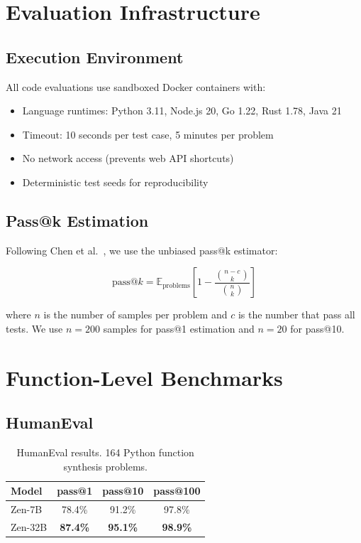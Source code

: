 \documentclass[11pt,a4paper]{article}
\begin{document}
\section{Evaluation Infrastructure}

\subsection{Execution Environment}

All code evaluations use sandboxed Docker containers with:
\begin{itemize}
  \item Language runtimes: Python 3.11, Node.js 20, Go 1.22, Rust 1.78, Java 21
  \item Timeout: 10 seconds per test case, 5 minutes per problem
  \item No network access (prevents web API shortcuts)
  \item Deterministic test seeds for reproducibility
\end{itemize}

\subsection{Pass@k Estimation}

Following Chen et al.~\cite{chen2021humaneval}, we use the unbiased pass@k estimator:

\begin{equation}
\text{pass@}k = \mathbb{E}_{\text{problems}}\left[1 - \frac{\binom{n-c}{k}}{\binom{n}{k}}\right]
\end{equation}

where $n$ is the number of samples per problem and $c$ is the number that pass all tests.
We use $n=200$ samples for pass@1 estimation and $n=20$ for pass@10.

\section{Function-Level Benchmarks}

\subsection{HumanEval}

\begin{table}[H]
\centering
\begin{tabular}{lccc}
\toprule
\textbf{Model} & \textbf{pass@1} & \textbf{pass@10} & \textbf{pass@100} \\
\midrule
Zen-7B & 78.4\% & 91.2\% & 97.8\% \\
Zen-32B & \textbf{87.4\%} & \textbf{95.1\%} & \textbf{98.9\%} \\
\bottomrule
\end{tabular}
\caption{HumanEval results. 164 Python function synthesis problems.}
\end{table}
\end{document}
